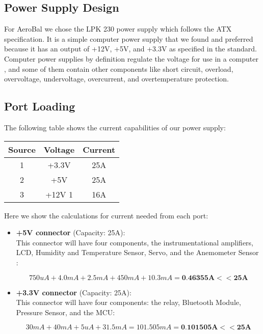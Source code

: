	
	\subsection{Power Supply Design}
	
	For AeroBal we chose the LPK 230 power supply which follows the ATX specification. It is a simple computer power supply that we found and preferred because it has an output of +12V, +5V, and +3.3V as specified in the standard. Computer power supplies by definition regulate the voltage for use in a computer , and some of them contain other components like short circuit, overload, overvoltage, undervoltage, overcurrent, and overtemperature protection. 

	\subsection{Port Loading}
	
	The following table shows the current capabilities of our power supply: \\
	\begin{center}
		\begin{tabular}{|c|c|c|}
			\hline
				Source & Voltage & Current  \\
			\hline
				1 & +3.3V & 25A  \\
				2 & +5V & 25A  \\
				3 & +12V 1 & 16A  \\
			\hline
		\end{tabular}
	\end{center}

		
		Here we show the calculations for current needed from each port:
		
		\begin{itemize}
			\item \textbf{+5V connector} (Capacity: 25A):\\
			  
			  	This connector will have four components, the instrumentational amplifiers, LCD, Humidity and Temperature Sensor, Servo, and the Anemometer Sensor : 

			  	$$750uA + 4.0mA + 2.5mA + 450mA + 10.3mA = \textbf{0.46355A} << \textbf{25A} $$
			  
			\item \textbf{+3.3V connector} (Capacity: 25A):\\
				
				This connector will have four components: the relay, Bluetooth Module, Pressure Sensor, and the MCU:

			  	$$ 30mA + 40mA + 5uA + 31.5mA = 101.505 mA = \textbf{0.101505A}  << \textbf{25A} $$
			  
		\end{itemize} 
		
